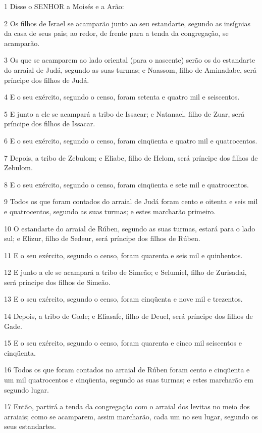 \par 1 Disse o SENHOR a Moisés e a Arão:
\par 2 Os filhos de Israel se acamparão junto ao seu estandarte, segundo as insígnias da casa de seus pais; ao redor, de frente para a tenda da congregação, se acamparão.
\par 3 Os que se acamparem ao lado oriental (para o nascente) serão os do estandarte do arraial de Judá, segundo as suas turmas; e Naassom, filho de Aminadabe, será príncipe dos filhos de Judá.
\par 4 E o seu exército, segundo o censo, foram setenta e quatro mil e seiscentos.
\par 5 E junto a ele se acampará a tribo de Issacar; e Natanael, filho de Zuar, será príncipe dos filhos de Issacar.
\par 6 E o seu exército, segundo o censo, foram cinqüenta e quatro mil e quatrocentos.
\par 7 Depois, a tribo de Zebulom; e Eliabe, filho de Helom, será príncipe dos filhos de Zebulom.
\par 8 E o seu exército, segundo o censo, foram cinqüenta e sete mil e quatrocentos.
\par 9 Todos os que foram contados do arraial de Judá foram cento e oitenta e seis mil e quatrocentos, segundo as suas turmas; e estes marcharão primeiro.
\par 10 O estandarte do arraial de Rúben, segundo as suas turmas, estará para o lado sul; e Elizur, filho de Sedeur, será príncipe dos filhos de Rúben.
\par 11 E o seu exército, segundo o censo, foram quarenta e seis mil e quinhentos.
\par 12 E junto a ele se acampará a tribo de Simeão; e Selumiel, filho de Zurisadai, será príncipe dos filhos de Simeão.
\par 13 E o seu exército, segundo o censo, foram cinqüenta e nove mil e trezentos.
\par 14 Depois, a tribo de Gade; e Eliasafe, filho de Deuel, será príncipe dos filhos de Gade.
\par 15 E o seu exército, segundo o censo, foram quarenta e cinco mil seiscentos e cinqüenta.
\par 16 Todos os que foram contados no arraial de Rúben foram cento e cinqüenta e um mil quatrocentos e cinqüenta, segundo as suas turmas; e estes marcharão em segundo lugar.
\par 17 Então, partirá a tenda da congregação com o arraial dos levitas no meio dos arraiais; como se acamparem, assim marcharão, cada um no seu lugar, segundo os seus estandartes.
